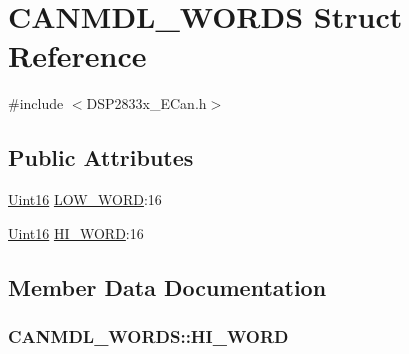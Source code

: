 \hypertarget{struct_c_a_n_m_d_l___w_o_r_d_s}{}\section{C\+A\+N\+M\+D\+L\+\_\+\+W\+O\+R\+D\+S Struct Reference}
\label{struct_c_a_n_m_d_l___w_o_r_d_s}


{\ttfamily \#include $<$D\+S\+P2833x\+\_\+\+E\+Can.\+h$>$}

\subsection*{Public Attributes}
\begin{DoxyCompactItemize}
\item 
\hyperlink{_d_s_p2833x___device_8h_a59a9f6be4562c327cbfb4f7e8e18f08b}{Uint16} \hyperlink{struct_c_a_n_m_d_l___w_o_r_d_s_a8f865fab7385c5fcd3c0149b8416f02b}{L\+O\+W\+\_\+\+W\+O\+R\+D}\+:16
\item 
\hyperlink{_d_s_p2833x___device_8h_a59a9f6be4562c327cbfb4f7e8e18f08b}{Uint16} \hyperlink{struct_c_a_n_m_d_l___w_o_r_d_s_ad4a832d44bce28dda612ff25ab494fc1}{H\+I\+\_\+\+W\+O\+R\+D}\+:16
\end{DoxyCompactItemize}


\subsection{Member Data Documentation}
\hypertarget{struct_c_a_n_m_d_l___w_o_r_d_s_ad4a832d44bce28dda612ff25ab494fc1}{}
\subsubsection[{H\+I\+\_\+\+W\+O\+R\+D}]{ C\+A\+N\+M\+D\+L\+\_\+\+W\+O\+R\+D\+S\+::\+H\+I\+\_\+\+W\+O\+R\+D}\label{struct_c_a_n_m_d_l___w_o_r_d_s_ad4a832d44bce28dda612ff25ab494fc1}
\hypertarget{struct_c_a_n_m_d_l___w_o_r_d_s_a8f865fab7385c5fcd3c0149b8416f02b}{}
